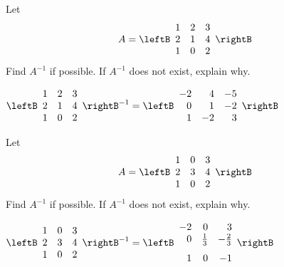 \begin{enumialphparenastyle}
\begin{ex}Let
\begin{equation*}
A=\leftB
\begin{array}{rrr}
1 & 2 & 3 \\
2 & 1 & 4 \\
1 & 0 & 2
\end{array}
\rightB 
\end{equation*}
Find $A^{-1}$ if possible. If $A^{-1}$ does not exist, explain why.
\begin{sol}
$\leftB
\begin{array}{ccc}
1 & 2 & 3 \\
2 & 1 & 4 \\
1 & 0 & 2
\end{array}
\rightB^{-1}= \leftB
\begin{array}{rrr}
-2 & 4 & -5 \\
0 & 1 & -2 \\
1 & -2 & 3
\end{array}
\rightB$
\end{sol}
\end{ex} 

\begin{ex}Let
\begin{equation*}
A=\leftB
\begin{array}{rrr}
1 & 0 & 3 \\
2 & 3 & 4 \\
1 & 0 & 2
\end{array}
\rightB 
\end{equation*}
Find $A^{-1}$ if possible. If $A^{-1}$ does not exist, explain why. 
\begin{sol}
$\leftB
\begin{array}{ccc}
1 & 0 & 3 \\
2 & 3 & 4 \\
1 & 0 & 2
\end{array}
\rightB^{-1}= \leftB
\begin{array}{rrr}
-2 & 0 & 3 \\
0 & \vspace{0.05in}\frac{1}{3} & -\vspace{0.05in}\frac{2}{3} \\
1 & 0 & -1
\end{array}
\rightB$
\end{sol}
\end{ex}


\end{enumialphparenastyle}
